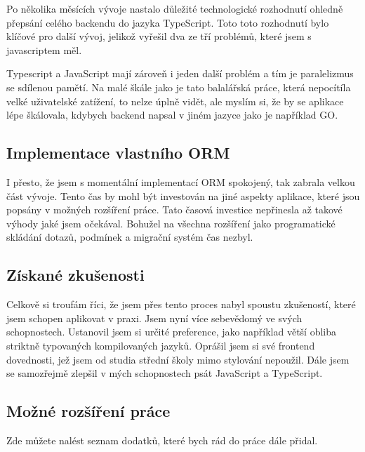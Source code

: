 Po několika měsících vývoje nastalo důležité technologické rozhodnutí ohledně přepsání celého backendu do jazyka TypeScript. Toto toto rozhodnutí bylo klíčové pro další vývoj, jelikož vyřešil dva ze tří problémů, které jsem s javascriptem měl.

Typescript a JavaScript mají zároveň i jeden další problém a tím je paralelizmus se sdílenou pamětí. Na malé škále jako je tato balalářská práce, která nepocítíla velké uživatelské zatížení, to nelze úplně vidět, ale myslím si, že by se aplikace lépe škálovala, kdybych backend napsal v jiném jazyce jako je například GO.

\subsection{Implementace vlastního ORM}

I přesto, že jsem s momentální implementací ORM spokojený, tak zabrala velkou část vývoje. Tento čas by mohl být investován na jiné aspekty aplikace, které jsou popsány v možných rozšíření práce. Tato časová investice nepřinesla až takové výhody jaké jsem očekával. Bohužel na všechna rozšíření jako programatické skládání dotazů, podmínek a migrační systém čas nezbyl.

\subsection{Získané zkušenosti}

Celkově si troufám říci, že jsem přes tento proces nabyl spoustu zkušeností, které jsem schopen aplikovat v praxi. Jsem nyní více sebevědomý ve svých schopnostech. Ustanovil jsem si určité preference, jako například větší obliba striktně typovaných kompilovaných jazyků. Oprášil jsem si své frontend dovednosti, jež jsem od studia střední školy mimo stylování nepoužil. Dále jsem se samozřejmě zlepšil v mých schopnostech psát JavaScript a TypeScript.

\subsection{Možné rozšíření práce}

Zde můžete nalést seznam dodatků, které bych rád do práce dále přidal.

